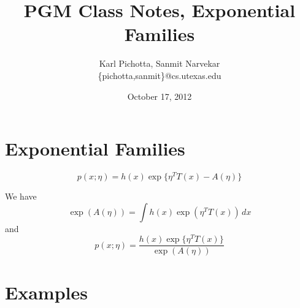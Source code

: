 \documentclass{article}
\title{PGM Class Notes, Exponential Families}
\author{Karl Pichotta, Sanmit Narvekar  \\ \{pichotta,sanmit\}@cs.utexas.edu}
\date{October 17, 2012}
\begin{document}
\maketitle




\section{Exponential Families}

$$
p(x;\eta) = h(x) \exp\{ \eta^TT(x) - A(\eta) \}
$$

We have
$$
\exp(A(\eta))
=
\int
h(x) 
\exp(\eta^TT(x))
\, dx
$$
and
$$
p(x;\eta)
=
\frac{h(x) \exp\{ \eta^T T(x)\}}
{\exp(A(\eta))}
$$


\section{Examples}
\end{document}
